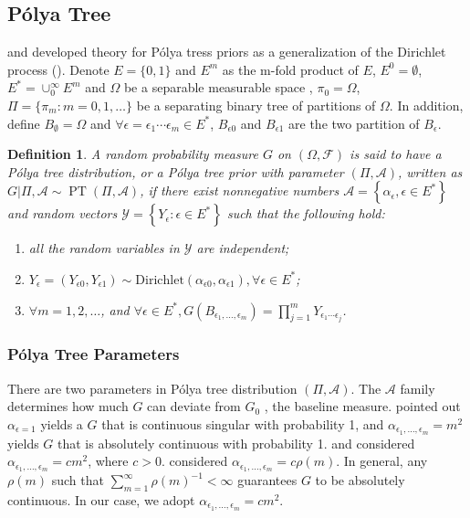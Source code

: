 \documentclass[12pt]{article}
\newtheorem{deff}[thm]{Definition}
\newcommand{\polya}{P\'{o}lya}
\DeclareMathOperator{\pt}{PT}
\begin{document}
\subsection{\polya{} Tree}
\citet{lavine1992, lavine1994} and \citet{mauldin1992} developed theory for
\polya{} tress priors as a generalization of the Dirichlet
process (\citet{ferguson1974}). Denote $E=\{0,1\}$ and $E^m$ as the m-fold
product of $E$, $E^0= \emptyset$, $E^{*} = \cup_0^{\infty} E^m$ and $\Omega$ be a separable
measurable space , $\pi_0 = \Omega$, $\Pi= \{ \pi_m: m=0,1, \ldots \}
$ be a separating binary tree of partitions of $\Omega$. In addition,
define $B_{\emptyset} = \Omega$ and $\forall \epsilon=\epsilon_1\cdots
\epsilon_m \in E^{*}$, $B_{\epsilon 0}$ and $B_{\epsilon 1}$ are the
two partition of $B_{\epsilon}$.  
\begin{deff}
  A random probability measure $G$ on $(\Omega, \mathcal{F})$ is said to
  have a \polya{} tree distribution, or a \polya{} tree prior with
  parameter $(\Pi, \mathcal{A})$, written as $G|\Pi, \mathcal{A} \sim
  \pt (\Pi, \mathcal{A})$, if there exist nonnegative numbers
  $\mathcal{A}= \left\{ \alpha_{\epsilon}, \epsilon \in E^{*} \right\}$
  and random vectors $\mathcal{Y} = \left\{ Y_{\epsilon} : \epsilon \in
    E^{*} \right\}$ such that the following hold:
  \begin{enumerate}
  \item\label{item:1} all the random variables in $\mathcal{Y}$ are independent;
  \item $Y_{\epsilon}= (Y_{\epsilon 0} , Y_{\epsilon 1}) \sim
    \mathrm{Dirichlet}(\alpha_{\epsilon 0 }, \alpha_{\epsilon 1}),
    \forall \epsilon \in E^{*}$;
  \item $\forall m=1,2, \ldots$, and $\forall \epsilon \in E^{*},
    G(B_{\epsilon_{1}, \ldots, \epsilon_m}) = \prod_{j=1}^m Y_{\epsilon_1
      \cdots \epsilon_j}$.
  \end{enumerate} 
\end{deff}

\subsubsection{\polya{} Tree Parameters}
There are two parameters in \polya{} tree distribution $(\Pi,
\mathcal{A})$. The $\mathcal{A}$ family determines how much $G$ can
deviate from $G_0$ , the baseline measure. \citet{ferguson1974} pointed out
$\alpha_{\epsilon = 1} $ yields a $G$ that is continuous singular with
probability 1, and $\alpha_{\epsilon_1, \ldots, \epsilon_m} = m^2$
yields $G$ that is absolutely continuous with probability 1. \citet{walker1999}
and \citet{paddock1999} considered $\alpha_{\epsilon_1,
  \ldots, \epsilon_m} = cm^2$, where $c > 0$. \citet{berger2001}
considered $\alpha_{\epsilon_1, \ldots, \epsilon_m} = c 
\rho(m)$. In general, any $\rho(m) $ such that $\sum_{m=1}^{\infty}
\rho(m)^{-1} < \infty$ guarantees $G$ to be absolutely continuous. In
our case, we adopt $\alpha_{\epsilon_1, \ldots, \epsilon_m} = cm^2$.
\end{document}
